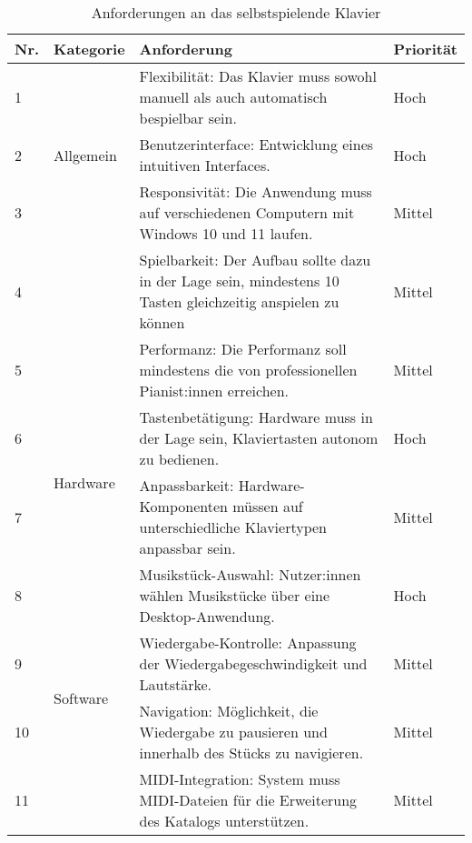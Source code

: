 \begin{table}[ht]
    \centering
    \begin{tabular}{ | m{1cm} | m{2cm} | m{8cm} | m{2cm} | }
        \hline
        \textbf{Nr.} & \textbf{Kategorie} & \textbf{Anforderung} & \textbf{Priorität} \\
        \hline
        1 & \multirow{3}{2cm}{Allgemein} & Flexibilität: Das Klavier muss sowohl manuell als auch automatisch bespielbar sein. & Hoch \\
        \cline{1-1} \cline{3-4}
        2 & & Benutzerinterface: Entwicklung eines intuitiven Interfaces. & Hoch \\
        \cline{1-1} \cline{3-4}
        3 & & Responsivität: Die Anwendung muss auf verschiedenen Computern mit Windows 10 und 11 laufen. & Mittel \\
        \cline{1-1} \cline{3-4}
        4 & & Spielbarkeit: Der Aufbau sollte dazu in der Lage sein, mindestens 10 Tasten gleichzeitig anspielen zu können & Mittel \\
        \cline{1-1} \cline{3-4}
        5 & & Performanz: Die Performanz soll mindestens die von professionellen Pianist:innen erreichen. & Mittel\\
        \hline
        6 & \multirow{2}{2cm}{Hardware} & Tastenbetätigung: Hardware muss in der Lage sein, Klaviertasten autonom zu bedienen. & Hoch \\
        \cline{1-1} \cline{3-4}
        7 & & Anpassbarkeit: Hardware-Komponenten müssen auf unterschiedliche Klaviertypen anpassbar sein. & Mittel \\
        \hline
        8 & \multirow{4}{2cm}{Software} & Musikstück-Auswahl: Nutzer:innen wählen Musikstücke über eine Desktop-Anwendung. & Hoch \\
        \cline{1-1} \cline{3-4}
        9 & & Wiedergabe-Kontrolle: Anpassung der Wiedergabegeschwindigkeit und Lautstärke. & Mittel \\
        \cline{1-1} \cline{3-4}
        10 & & Navigation: Möglichkeit, die Wiedergabe zu pausieren und innerhalb des Stücks zu navigieren. & Mittel \\
        \cline{1-1} \cline{3-4}
        11 & & MIDI-Integration: System muss MIDI-Dateien für die Erweiterung des Katalogs unterstützen. & Mittel \\
        \hline
    \end{tabular}
    \caption{Anforderungen an das selbstspielende Klavier}
    \label{table:anforderungen}
\end{table}



